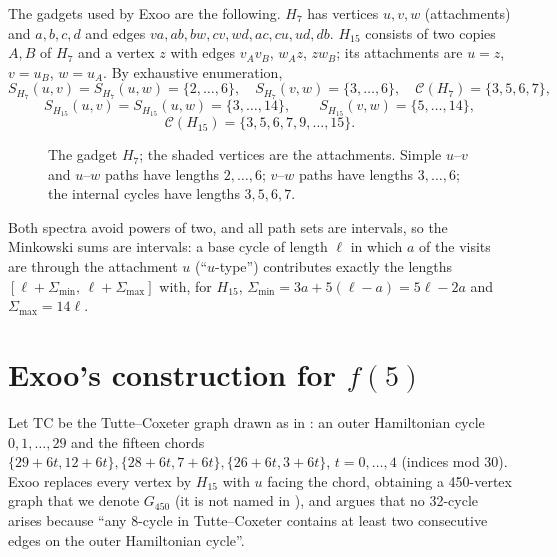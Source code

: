 \documentclass[11pt]{article}
\theoremstyle{remark}
\theoremstyle{definition}
\newcommand{\Cyc}{\mathcal{C}}
\newcommand{\TC}{\mathrm{TC}}
\begin{document}
The gadgets used by Exoo are the following. $H_7$ has vertices $u,v,w$ (attachments) and $a,b,c,d$ and edges $va,ab,bw,cv,wd,ac,cu,ud,db$. $H_{15}$ consists of two copies $A,B$ of $H_7$ and a vertex $z$ with edges $v_Av_B$, $w_Az$, $zw_B$; its attachments are $u=z$, $v=u_B$, $w=u_A$. By exhaustive enumeration,
\[
S_{H_7}(u,v)=S_{H_7}(u,w)=\{2,\dots,6\},\quad S_{H_7}(v,w)=\{3,\dots,6\},\quad \Cyc(H_7)=\{3,5,6,7\},
\]
\[
S_{H_{15}}(u,v)=S_{H_{15}}(u,w)=\{3,\dots,14\},\qquad S_{H_{15}}(v,w)=\{5,\dots,14\},
\]
\[
\Cyc(H_{15})=\{3,5,6,7,9,\dots,15\}.
\]
\begin{figure}[ht]
\centering
{}
\caption{The gadget $H_7$; the shaded vertices are the attachments. Simple $u$--$v$ and $u$--$w$ paths have lengths $2,\dots,6$; $v$--$w$ paths have lengths $3,\dots,6$; the internal cycles have lengths $3,5,6,7$.}
\label{fig:h7}
\end{figure}

Both spectra avoid powers of two, and all path sets are intervals, so the Minkowski sums are intervals: a base cycle of length $\ell$ in which $a$ of the visits are through the attachment $u$ (``$u$-type'') contributes exactly the lengths $[\ell+\Sigma_{\min},\,\ell+\Sigma_{\max}]$ with, for $H_{15}$, $\Sigma_{\min}=3a+5(\ell-a)=5\ell-2a$ and $\Sigma_{\max}=14\ell$.

\section{Exoo's construction for \texorpdfstring{$f(5)$}{f(5)}}

Let $\TC$ be the Tutte--Coxeter graph drawn as in \cite{Exoo}: an outer Hamiltonian cycle $0,1,\dots,29$ and the fifteen chords $\{29+6t,12+6t\},\{28+6t,7+6t\},\{26+6t,3+6t\}$, $t=0,\dots,4$ (indices mod 30). Exoo replaces every vertex by $H_{15}$ with $u$ facing the chord, obtaining a 450-vertex graph that we denote $G_{450}$ (it is not named in \cite{Exoo}), and argues that no 32-cycle arises because ``any 8-cycle in Tutte--Coxeter contains at least two consecutive edges on the outer Hamiltonian cycle''.
\end{document}
